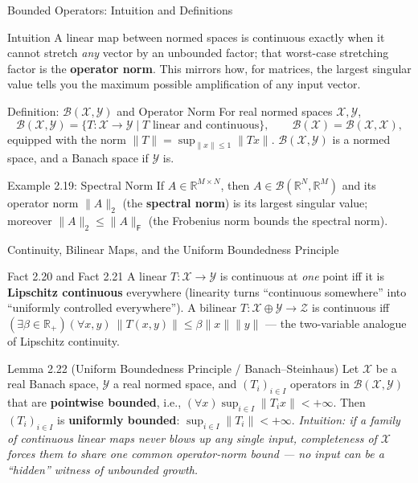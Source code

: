 \documentclass[aspectratio=169,10pt]{beamer}
\newcommand{\R}{\mathbb{R}}
\begin{document}
\begin{frame}{Bounded Operators: Intuition and Definitions}
  \begin{block}{Intuition}
    A linear map between normed spaces is continuous exactly when it cannot
    stretch \emph{any} vector by an unbounded factor; that worst-case
    stretching factor is the \textbf{operator norm}. This mirrors how, for
    matrices, the largest singular value tells you the maximum possible
    amplification of any input vector.
  \end{block}

  \begin{block}{Definition: $\mathcal B(\mathcal X,\mathcal Y)$ and Operator Norm}
    For real normed spaces $\mathcal X,\mathcal Y$,
    \[
      \mathcal B(\mathcal X,\mathcal Y) = \{T:\mathcal X\to\mathcal Y \mid T
      \text{ linear and continuous}\}, \qquad \mathcal B(\mathcal X) =
      \mathcal B(\mathcal X,\mathcal X),
    \]
    equipped with the norm $\|T\| = \sup_{\|x\|\le 1}\|Tx\|$. $\mathcal
    B(\mathcal X,\mathcal Y)$ is a normed space, and a Banach space if
    $\mathcal Y$ is.
  \end{block}

  \begin{exampleblock}{Example 2.19: Spectral Norm}
    If $A\in\R^{M\times N}$, then $A\in\mathcal B(\R^N,\R^M)$ and its
    operator norm $\|A\|_2$ (the \textbf{spectral norm}) is its largest
    singular value; moreover $\|A\|_2\le\|A\|_{\mathsf F}$ (the Frobenius
    norm bounds the spectral norm).
  \end{exampleblock}
\end{frame}

\begin{frame}{Continuity, Bilinear Maps, and the Uniform Boundedness Principle}
  \begin{block}{Fact 2.20 and Fact 2.21}
    A linear $T:\mathcal X\to\mathcal Y$ is continuous at \emph{one} point
    iff it is \textbf{Lipschitz continuous} everywhere (linearity turns
    ``continuous somewhere'' into ``uniformly controlled everywhere''). A
    bilinear $T:\mathcal X\oplus\mathcal Y\to\mathcal Z$ is continuous iff
    $(\exists\beta\in\R_+)(\forall x,y)\ \|T(x,y)\|\le\beta\|x\|\|y\|$ ---
    the two-variable analogue of Lipschitz continuity.
  \end{block}

  \begin{block}{Lemma 2.22 (Uniform Boundedness Principle / Banach--Steinhaus)}
    Let $\mathcal X$ be a real Banach space, $\mathcal Y$ a real normed
    space, and $(T_i)_{i\in I}$ operators in $\mathcal B(\mathcal
    X,\mathcal Y)$ that are \textbf{pointwise bounded}, i.e.,
    $(\forall x)\sup_{i\in I}\|T_ix\|<+\infty$. Then $(T_i)_{i\in I}$ is
    \textbf{uniformly bounded}: $\sup_{i\in I}\|T_i\|<+\infty$.
    \textit{Intuition: if a family of continuous linear maps never blows up
    any single input, completeness of $\mathcal X$ forces them to share one
    common operator-norm bound --- no input can be a ``hidden'' witness of
    unbounded growth.}
  \end{block}
\end{frame}
\end{document}
